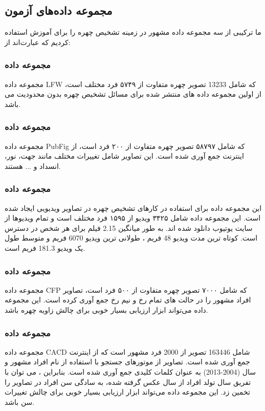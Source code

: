 \subsection{مجموعه داده‌های آزمون}
ما ترکیبی از سه مجموعه داده مشهور در زمینه تشخیص چهره را برای آموزش استفاده کردیم که عبارت‌اند از:

\subsubsection{مجموعه داده }
مجموعه داده LFW  که شامل 13233 تصویر چهره متفاوت از ۵۷۴۹ فرد مختلف است، از اولین مجموعه داده های منتشر شده برای مسائل تشخیص چهره بدون محدودیت می باشد. \cite{LFW_dataset}

\subsubsection{مجموعه داده }
مجموعه داده PubFig  که شامل ۵۸۷۹۷ تصویر چهره متفاوت از ۲۰۰ فرد است، از اینترنت جمع آوری شده است. این تصاویر شامل تغییرات مختلف مانند جهت، نور، انسداد و ... هستند. \cite{PubFig_dataset}

\subsubsection{مجموعه داده }
این مجموعه داده برای استفاده در کارهای تشخیص چهره در تصاویر ویدیویی ایجاد شده است. این مجموعه داده شامل ۳۴۲۵ ویدیو از ۱۵۹۵ فرد مختلف است و تمام ویدیوها از سایت یوتیوب دانلود شده اند. به طور میانگین 2.15 فیلم برای هر شخص در دسترس است. کوتاه ترین مدت ویدیو 48 فریم ، طولانی ترین ویدیو 6070 فریم و متوسط طول یک ویدیو 181.3 فریم است. \cite{VGGFace2_dataset}

\subsubsection{مجموعه داده }
مجموعه داده CFP  که شامل ۷۰۰۰ تصویر چهره متفاوت از ۵۰۰ فرد است، تصاویر افراد مشهور را در حالت های تمام رخ و نیم رخ جمع آوری کرده است. این مجموعه داده می‌تواند ابزار ارزیابی بسیار خوبی برای چالش زاویه چهره باشد. \cite{LFW_dataset}

\subsubsection{مجموعه داده }
مجموعه داده CACD  شامل 163446 تصویر از 2000 فرد مشهور است که از اینترنت جمع آوری شده است. تصاویر از موتورهای جستجو با استفاده از نام افراد مشهور و سال (2004-2013) به عنوان کلمات کلیدی جمع آوری شده است. بنابراین ، می توان با تفریق سال تولد افراد از سال عکس گرفته شده، به سادگی سن افراد در تصاویر را تخمین زد. این مجموعه داده می‌تواند ابزار ارزیابی بسیار خوبی برای چالش تغییرات سن باشد. \cite{CACD_dataset}

